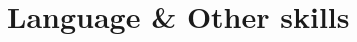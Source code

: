 \documentclass[a4paper,10pt]{article} %
\begin{document}







\section{Language \& Other skills}
\end{document}
